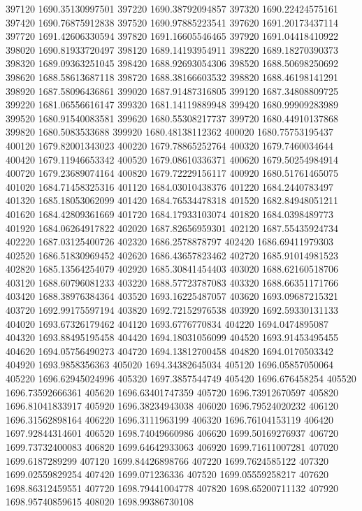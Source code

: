 {397120 1690.35130997501
397220 1690.38792094857
397320 1690.22424575161
397420 1690.76875912838
397520 1690.97885223541
397620 1691.20173437114
397720 1691.42606330594
397820 1691.16605546465
397920 1691.04418410922
398020 1690.81933720497
398120 1689.14193954911
398220 1689.18270390373
398320 1689.09363251045
398420 1688.92693054306
398520 1688.50698250692
398620 1688.58613687118
398720 1688.38166603532
398820 1688.46198141291
398920 1687.58096436861
399020 1687.91487316805
399120 1687.34808809725
399220 1681.06556616147
399320 1681.14119889948
399420 1680.99909283989
399520 1680.91540083581
399620 1680.55308217737
399720 1680.44910137868
399820 1680.5083533688
399920 1680.48138112362
400020 1680.75753195437
400120 1679.82001343023
400220 1679.78865252764
400320 1679.7460034644
400420 1679.11946653342
400520 1679.08610336371
400620 1679.50254984914
400720 1679.23689074164
400820 1679.72229156117
400920 1680.51761465075
401020 1684.71458325316
401120 1684.03010438376
401220 1684.2440783497
401320 1685.18053062099
401420 1684.76534478318
401520 1682.84948051211
401620 1684.42809361669
401720 1684.17933103074
401820 1684.0398489773
401920 1684.06264917822
402020 1687.82656959301
402120 1687.55435924734
402220 1687.03125400726
402320 1686.2578878797
402420 1686.69411979303
402520 1686.51830969452
402620 1686.43657823462
402720 1685.91014981523
402820 1685.13564254079
402920 1685.30841454403
403020 1688.62160518706
403120 1688.60796081233
403220 1688.57723787083
403320 1688.66351171766
403420 1688.38976384364
403520 1693.16225487057
403620 1693.09687215321
403720 1692.99175597194
403820 1692.72152976538
403920 1692.59330131133
404020 1693.67326179462
404120 1693.6776770834
404220 1694.0474895087
404320 1693.88495195458
404420 1694.18031056099
404520 1693.91453495455
404620 1694.05756490273
404720 1694.13812700458
404820 1694.0170503342
404920 1693.9858356363
405020 1694.34382645034
405120 1696.05857050064
405220 1696.62945024996
405320 1697.3857544749
405420 1696.676458254
405520 1696.73592666361
405620 1696.63401747359
405720 1696.73912670597
405820 1696.81041833917
405920 1696.38234943038
406020 1696.79524020232
406120 1696.31562898164
406220 1696.3111963199
406320 1696.76104153119
406420 1697.92844314601
406520 1698.74049660986
406620 1699.50169276937
406720 1699.73732400083
406820 1699.64642933063
406920 1699.71611007281
407020 1699.6187289299
407120 1699.84426898766
407220 1699.7624585122
407320 1699.02559829254
407420 1699.071236336
407520 1699.05559258217
407620 1698.86312459551
407720 1698.79441004778
407820 1698.65200711132
407920 1698.95740859615
408020 1698.99386730108
}
